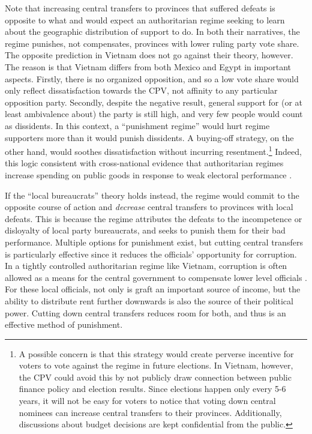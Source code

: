 \documentclass[12pt]{article}\usepackage[]{graphicx}\usepackage[]{color}
\newcommand{\1}{\mathbbm{1}}
\begin{document}
Note that increasing central transfers to provinces that suffered defeats is opposite to what \cite{Magaloni2006} and \cite{Blaydes2008} would expect an authoritarian regime seeking to learn about the geographic distribution of support to do. In both their narratives, the regime punishes, not compensates, provinces with lower ruling party vote share. The opposite prediction in Vietnam does not go against their theory, however. The reason is that Vietnam differs from both Mexico and Egypt in important aspects. Firstly, there is no organized opposition, and so a low vote share would only reflect dissatisfaction towards the CPV, not affinity to any particular opposition party. Secondly, despite the negative result, general support for (or at least ambivalence about) the party is still high, and very few people would count as dissidents. In this context, a ``punishment regime'' would hurt regime supporters more than it would punish dissidents. A  buying-off strategy, on the other hand, would soothes dissatisfaction without incurring resentment.\footnote{A possible concern is that this strategy would create perverse incentive for voters to vote against the regime in future elections. In Vietnam, however, the CPV could avoid this by not publicly draw connection between public finance policy and election results. Since elections happen only every 5-6 years, it will not be easy for voters to notice that voting down central nominees can increase central transfers to their provinces. Additionally, discussions about budget decisions are kept confidential from the public.} Indeed, this logic consistent with cross-national evidence that authoritarian regimes increase spending on public goods in response to weak electoral performance \citep{Miller2015}.

If the ``local bureaucrats'' theory holds instead, the regime would commit to the opposite course of action and \textit{decrease} central transfers to provinces with local defeats. This is because the regime attributes the defeats to the incompetence or disloyalty of local party bureaucrats, and seeks to punish them for their bad performance. Multiple options for punishment exist, but cutting central transfers is particularly effective since it reduces the officials' opportunity for corruption. In a tightly controlled authoritarian regime like Vietnam, corruption is often allowed as a means for the central government to compensate lower level officials \citep{Darden2008}. For these local officials, not only is graft an important source of income, but the ability to distribute rent further downwards is also the source of their political power. Cutting down central transfers reduces room for both, and thus is an effective method of punishment.
\end{document}
